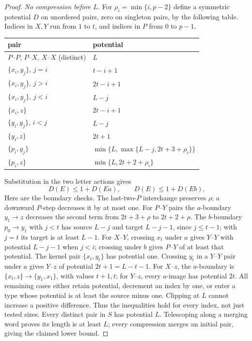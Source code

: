 \begin{proof}
\emph{No compression before $L$.}
For $\rho_i=\min\{i,p-2\}$ define a symmetric potential $D$ on unordered
pairs, zero on singleton pairs, by the following table. Indices in $X,Y$
run from $1$ to $t$, and indices in $P$ from $0$ to $p-1$.
\begin{center}\small
\begin{tabular}{ll}
pair&potential\\ \hline
$P$--$P$, $P$--$X$, $X$--$X$ (distinct)&$L$\\
$\{x_i,y_j\}$, $j=i$&$t-i+1$\\
$\{x_i,y_j\}$, $j>i$&$2t-i+1$\\
$\{x_i,y_j\}$, $j<i$&$L-j$\\
$\{x_i,z\}$&$2t-i+1$\\
$\{y_i,y_j\}$, $i<j$&$L-j$\\
$\{y_i,z\}$&$2t+1$\\
$\{p_i,y_j\}$&$\min\{L,\max\{L-j,2t+3+\rho_i\}\}$\\
$\{p_i,z\}$&$\min\{L,2t+2+\rho_i\}$
\end{tabular}
\end{center}
Substitution in the two letter actions gives
\[
 D(E)\le1+D(Ea),\qquad D(E)\le1+D(Eb).
\]
Here are the boundary checks. The last-two-$P$ interchange preserves $\rho$;
a downward $P$-step decreases it by at most one.
For $P$--$Y$ pairs the $a$-boundary $y_t\to z$ decreases the second term
from $2t+3+\rho$ to $2t+2+\rho$.
The $b$-boundary $p_0\to y_1$ with $j<t$ has source $L-j$
and target $L-j-1$, since $j\le t-1$; with $j=t$ its target is at least $L-1$.
For $X$--$Y$, crossing $x_t$ under $a$ gives $Y$--$Y$ with potential $L-j-1$
when $j<i$; crossing under $b$ gives $P$--$Y$ of at least that potential.
The kernel pair $\{x_t,y_t\}$ has potential one.
Crossing $y_t$ in a $Y$--$Y$ pair under $a$ gives $Y$--$z$ of
potential $2t+1=L-t-1$.
For $X$--$z$, the $a$-boundary is $\{x_t,z\}\to\{y_1,x_1\}$,
with values $t+1,t$; for $Y$--$z$, every $a$-image has potential $2t$.
All remaining cases either retain potential, decrement an index by one,
or enter a type whose potential is at least the source minus one.
Clipping at $L$ cannot increase a positive difference.
Thus the inequalities hold for every index, not just tested sizes.
Every distinct pair in $S$ has potential $L$.
Telescoping along a merging word proves its length is at least $L$;
every compression merges an initial pair, giving the claimed lower bound.


\end{proof}
